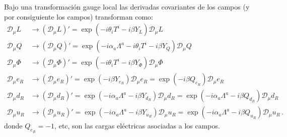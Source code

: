 \begin{frame}
Bajo una transformación gauge local las derivadas covariantes de los campos (y por consiguiente los campos) transforman como:
\begin{align}
  \mathcal{D}_\mu L&\to\left(\mathcal{D}_\mu L\right)'=\exp\left(-i\theta_iT^i-i\beta Y_L\right)\mathcal{D}_\mu L\nonumber\\
  \mathcal{D}_\mu Q&\to\left(\mathcal{D}_\mu Q\right)'=\exp\left(-i\alpha_a\Lambda^a-i\theta_iT^i-i\beta Y_Q\right)\mathcal{D}_\mu Q\nonumber\\
  \mathcal{D}_\mu \Phi&\to\left(\mathcal{D}_\mu \Phi\right)'=\exp\left(-i\theta_iT^i-i\beta Y_\Phi\right)\mathcal{D}_\mu \Phi\nonumber\\
  \mathcal{D}_\mu e_R&\to\left(\mathcal{D}_\mu e_R\right)'=\exp\left(-i\beta Y_{e_R}\right)\mathcal{D}_\mu e_R=\exp\left(-i\beta Q_{e_R}\right)\mathcal{D}_\mu e_R\nonumber\\
  \mathcal{D}_\mu d_R&\to\left(\mathcal{D}_\mu d_R\right)'=\exp\left(-i\alpha_a\Lambda^a-i\beta Y_{d_R}\right)\mathcal{D}_\mu d_R=\exp\left(-i\alpha_a\Lambda^a-i\beta Q_{d_R}\right)\mathcal{D}_\mu d_R\nonumber\\
  \mathcal{D}_\mu u_R&\to\left(\mathcal{D}_\mu u_R\right)'=\exp\left(-i\alpha_a\Lambda^a-i\beta Y_{u_R}\right)\mathcal{D}_\mu u_R=\exp\left(-i\alpha_a\Lambda^a-i\beta Q_{u_R}\right)\mathcal{D}_\mu u_R\,.
\end{align}
donde $Q_{e_R}=-1$, etc, son las cargas eléctricas asociadas a los campos.


\end{frame}
